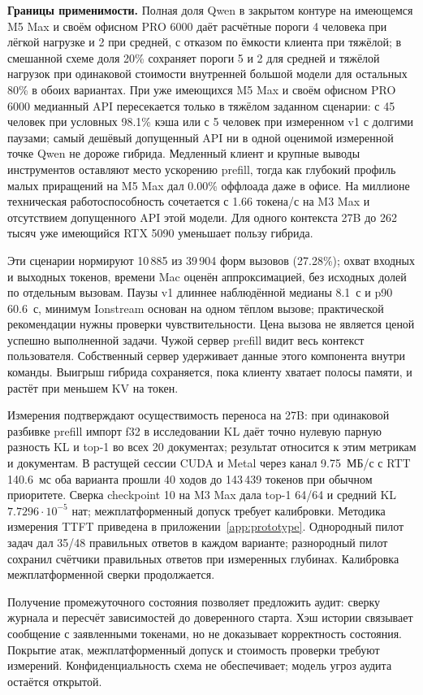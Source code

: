 \textbf{Границы применимости.} Полная доля Qwen в закрытом контуре на имеющемся M5 Max и своём офисном PRO 6000 даёт расчётные пороги 4 человека при лёгкой нагрузке и 2 при средней, с отказом по ёмкости клиента при тяжёлой; в смешанной схеме доля 20\% сохраняет пороги 5 и 2 для средней и тяжёлой нагрузок при одинаковой стоимости внутренней большой модели для остальных 80\% в обоих вариантах.
При уже имеющихся M5 Max и своём офисном PRO 6000 медианный API пересекается только в тяжёлом заданном сценарии:
с 45 человек при условных 98.1\% кэша или с 5 человек при измеренном v1 с долгими паузами;
самый дешёвый допущенный API ни в одной оценимой измеренной точке Qwen не дороже гибрида.
Медленный клиент и крупные выводы инструментов оставляют место ускорению prefill, тогда как глубокий профиль
малых приращений на M5 Max дал 0.00\% оффлоада даже в офисе.
На миллионе техническая работоспособность сочетается с 1.66 токена/с на M3 Max и отсутствием допущенного API этой модели.
Для одного контекста 27B до 262 тысяч уже имеющийся RTX 5090 уменьшает пользу гибрида.

Эти сценарии нормируют 10\,885 из 39\,904 форм вызовов (27.28\%); охват входных и выходных токенов, времени Mac оценён аппроксимацией, без исходных долей по отдельным вызовам.
Паузы v1 длиннее наблюдённой медианы 8.1~с и p90 60.6~с, минимум Ionstream основан на одном тёплом вызове;
практической рекомендации нужны проверки чувствительности. Цена вызова не является ценой успешно выполненной задачи.
Чужой сервер prefill видит весь контекст пользователя. Собственный сервер удерживает данные этого компонента внутри команды.
Выигрыш гибрида сохраняется, пока клиенту хватает полосы памяти, и растёт при меньшем KV на токен.

Измерения подтверждают осуществимость переноса на 27B: при одинаковой разбивке prefill
импорт f32 в исследовании KL даёт точно нулевую парную разность KL и top-1 во всех 20 документах; результат относится к этим метрикам и документам. В растущей сессии CUDA и Metal через канал 9.75~МБ/с с RTT 140.6~мс оба варианта прошли 40 ходов до 143\,439 токенов при обычном приоритете.
Сверка checkpoint 10 на M3 Max дала top-1 64/64 и средний KL $7.7296\cdot10^{-5}$ нат;
межплатформенный допуск требует калибровки. Методика измерения TTFT приведена в приложении~\ref{app:prototype}.
Однородный пилот задач дал 35/48 правильных ответов в каждом варианте; разнородный пилот
сохранил счётчики правильных ответов при измеренных глубинах. Калибровка межплатформенной сверки продолжается.

Получение промежуточного состояния позволяет предложить аудит: сверку журнала и пересчёт зависимостей до
доверенного старта. Хэш истории связывает сообщение с заявленными токенами, но не доказывает корректность
состояния. Покрытие атак, межплатформенный допуск и стоимость проверки требуют измерений.
Конфиденциальность схема не обеспечивает; модель угроз аудита остаётся открытой.

